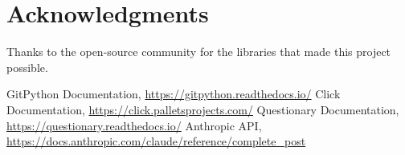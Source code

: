 \documentclass[sigconf]{acmart}
\begin{document}
\section{Acknowledgments}
Thanks to the open-source community for the libraries that made this project possible.


\begin{thebibliography}{00}
 GitPython Documentation, \url{https://gitpython.readthedocs.io/}
 Click Documentation, \url{https://click.palletsprojects.com/}
 Questionary Documentation, \url{https://questionary.readthedocs.io/}
 Anthropic API, \url{https://docs.anthropic.com/claude/reference/complete_post}
\end{thebibliography}
\end{document}
